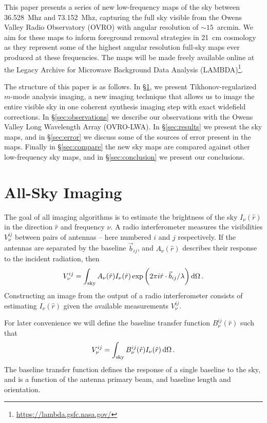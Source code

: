 \documentclass[twocolumn]{aastex61}
\renewcommand{\d}{{\rm d}}
\begin{document}
This paper presents a series of new low-frequency maps of the sky between 36.528~Mhz and 73.152~Mhz,
capturing the full sky visible from the Owens Valley Radio Observatory (OVRO) with angular
resolution of $\sim 15$~arcmin. We aim for these maps to inform foreground removal strategies in
21~cm cosmology as they represent some of the highest angular resolution full-sky maps ever produced
at these frequencies. The maps will be made freely available online at the Legacy Archive for
Microwave Background Data Analysis (LAMBDA)\footnote{\url{https://lambda.gsfc.nasa.gov/}}.

The structure of this paper is as follows. In \S\ref{sec:imaging}, we present Tikhonov-regularized
$m$-mode analysis imaging, a new imaging technique that allows us to image the entire visible sky in
one coherent synthesis imaging step with exact widefield corrections. In \S\ref{sec:observations} we
describe our observations with the Owens Valley Long Wavelength Array (OVRO-LWA). In
\S\ref{sec:results} we present the sky maps, and in \S\ref{sec:error} we discuss some of the sources
of error present in the maps. Finally in \S\ref{sec:compare} the new sky maps are compared against
other low-frequency sky maps, and in \S\ref{sec:conclusion} we present our conclusions.

\section{All-Sky Imaging}\label{sec:imaging}

The goal of all imaging algorithms is to estimate the brightness of the sky $I_\nu(\hat r)$ in the
direction $\hat r$ and frequency $\nu$. A radio interferometer measures the visibilities
$V^{ij}_{\nu}$ between pairs of antennas -- here numbered $i$ and $j$ respectively. If the antennas
are separated by the baseline $\vec b_{ij}$, and $A_\nu(\hat r)$ describes their response to the
incident radiation, then
\begin{equation}\label{eq:basic-imaging}
    V^{ij}_\nu = \int_\text{sky}
                 A_\nu(\hat r) I_\nu(\hat r)
                 \exp\bigg(2\pi i \hat r\cdot\vec b_{ij}/\lambda\bigg) \,\d\Omega \, .
\end{equation}
Constructing an image from the output of a radio interferometer consists of estimating $I_\nu(\hat
r)$ given the available measurements $V^{ij}_\nu$.

For later convenience we will define the baseline transfer function $B^{ij}_\nu(\hat r)$ such that
\begin{equation}\label{eq:baseline-transfer-function}
    V^{ij}_\nu = \int_\text{sky} B^{ij}_\nu(\hat r) I_\nu(\hat r) \,\d\Omega \, .
\end{equation}
The baseline transfer function defines the response of a single baseline to the sky, and is a
function of the antenna primary beam, and baseline length and orientation.
\end{document}
